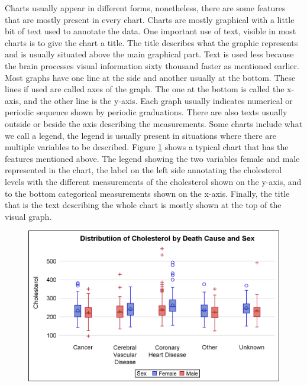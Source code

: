 \documentclass[12pt, a4paper,oneside]{report}
\begin{document}
Charts usually appear in different forms, nonetheless, there are some features that are mostly present in every chart. Charts are mostly graphical with a little bit of text used to annotate the data. One important use of text, visible in most charts is to give the chart a title. The title describes what the graphic represents and is usually situated above the main graphical part. Text is used less because the brain processes visual information sixty thousand faster \cite{humaneye} as mentioned earlier. Most graphs have one line at the side and another usually at the bottom. These lines if used are called axes of the graph. The one at the bottom is called the x-axis, and the other line is the y-axis. Each graph usually indicates numerical or periodic sequence shown by periodic graduations. There are also texts usually outside or beside the axis describing the measurements.
Some charts include what we call a legend, the legend is usually present in situations where there are multiple variables to be described. Figure \ref{fig:boxy} shows a typical chart that has the features mentioned above. The legend showing the two variables female and male represented in the chart, the label on the left side annotating the cholesterol levels with the different measurements of the cholesterol shown on the y-axis, and to the bottom categorical measurements shown on the x-axis. Finally, the title that is the text describing the whole chart is mostly shown at the top of the visual graph. 

\begin{figure}[!htb]
	\centering
	\includegraphics [scale=1.0] {box_color.png}
	\label{fig:boxy}
\end{figure}
\end{document}
